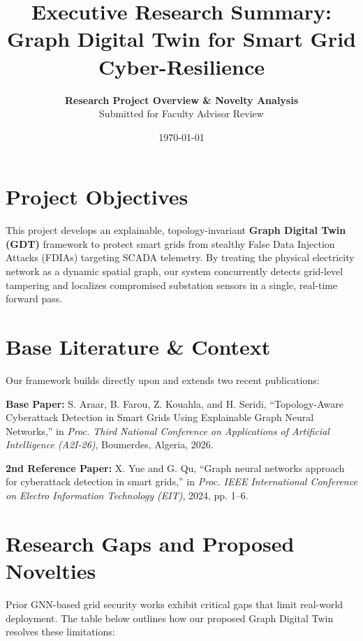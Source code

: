 \documentclass[11pt]{article}
\title{\textbf{Executive Research Summary: Graph Digital Twin for Smart Grid Cyber-Resilience}}
\author{\textbf{Research Project Overview \& Novelty Analysis} \\ Submitted for Faculty Advisor Review}
\date{\today}
\begin{document}
\maketitle

\section{Project Objectives}
This project develops an explainable, topology-invariant \textbf{Graph Digital Twin (GDT)} framework to protect smart grids from stealthy False Data Injection Attacks (FDIAs) targeting SCADA telemetry. By treating the physical electricity network as a dynamic spatial graph, our system concurrently detects grid-level tampering and localizes compromised substation sensors in a single, real-time forward pass.

\section{Base Literature \& Context}
Our framework builds directly upon and extends two recent publications:
\begin{enumerate}[label={[\arabic*]}]
    \item \textbf{Base Paper:} S. Araar, B. Farou, Z. Kouahla, and H. Seridi, ``Topology-Aware Cyberattack Detection in Smart Grids Using Explainable Graph Neural Networks,'' in \textit{Proc. Third National Conference on Applications of Artificial Intelligence (A2I-26)}, Boumerdes, Algeria, 2026.
    \item \textbf{2nd Reference Paper:} X. Yue and G. Qu, ``Graph neural networks approach for cyberattack detection in smart grids,'' in \textit{Proc. IEEE International Conference on Electro Information Technology (EIT)}, 2024, pp. 1--6.
\end{enumerate}

\section{Research Gaps and Proposed Novelties}
Prior GNN-based grid security works exhibit critical gaps that limit real-world deployment. The table below outlines how our proposed Graph Digital Twin resolves these limitations:
\end{document}
